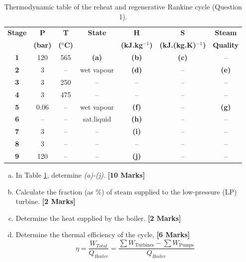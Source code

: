 \documentclass[calculator,steamtables,refrigeranttables]{exam}
\newcommand{\frc}{\displaystyle\frac}
\begin{document}
\begin{question}
\begin{table}[h]
\begin{center}
\begin{tabular} {||c | c c c c c c || }
\hline\hline
{\bf Stage} & {\bf P}    & {\bf T}        & {\bf State}    & {\bf H}             & {\bf S}                  & {\bf Steam}\\
            & {\bf (bar)}& {\bf ($^{o}$C)} &               & {\bf (kJ.kg$^{-1}$)} & {\bf (kJ.(kg.K)$^{-1}$)}  & {\bf Quality}\\
\hline\hline
 {\bf 1 }   & 120        & 565            &   {\bf (a)}    & {\bf (b)}           & {\bf (c)}                & --          \\
 {\bf 2 }   & 3          &  --            &   wet vapour   & {\bf (d)}           &   --                     & {\bf (e)}   \\
 {\bf 3 }   & 3          & 250            &   --           & --                  & --                       & --           \\
 {\bf 4 }   & 3          & 475            &   --           & --                  & --                       & --            \\
 {\bf 5 }   & 0.06       & --             &   wet vapour   & {\bf (f)}           & --                       & {\bf (g)}     \\
 {\bf 6 }   & --         & --             &   sat.liquid   & {\bf (h)}           & --                       & -- \\
 {\bf 7 }   & 3          & --             &   --           & {\bf (i)}           & --                       & --     \\
 {\bf 8 }   & 3          & --             &   --           & --                  & --                       & --           \\
 {\bf 9 }   & 120        & --             &   --           & {\bf (j)}           &  --                      & -- \\
\hline\hline
\end{tabular}
\end{center}
\caption{Thermodynamic table of the reheat and regenerative Rankine cycle (Question 1).}
\label{exam1_table1}
\end{table}


\begin{enumerate}[(a)]
\item In Table \ref{exam1_table1}, determine {\it (a)-(j)}. {\bf [10 Marks]}
%
\item Calculate the fraction (as $\%$) of steam supplied to the low-pressure (LP) turbine. {\bf [2 Marks]}
%
\item Determine the heat supplied by the boiler. {\bf [2 Marks]}
%
\item Determine the thermal efficiency of the cycle, {\bf [6 Marks]}
\begin{displaymath}
\eta=\frc{W_{Total}}{Q_{Boiler}} = \frc{\sum W_{\text{Turbines}} - \sum W_{\text{Pumps}}}{Q_{Boiler}}
\end{displaymath} 
%
\end{enumerate}


\end{question}
\end{document}
